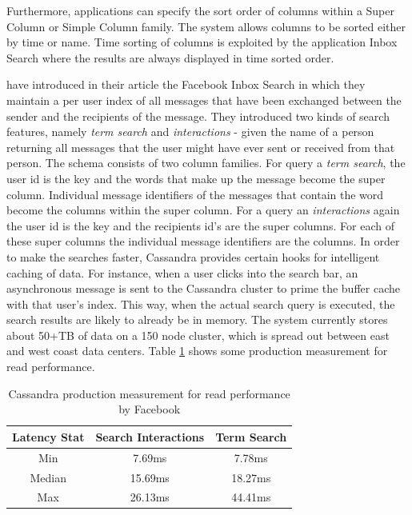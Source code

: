 Furthermore, applications can specify the sort order of columns within a Super Column or Simple Column family. The system allows columns to be sorted either by time or name. Time sorting of columns is exploited by the application Inbox Search where the results are always displayed in time sorted order.

\citeauthor{Lakshman:2010} have introduced in their article \cite{Lakshman:2010} the Facebook Inbox Search in which they maintain a per user index of all messages that have been exchanged between the sender and the recipients of the message. They introduced two kinds of search features, namely \textit{term search} and \textit{interactions} - given the name of a person returning all messages that the user might have ever sent or received from that person. The schema consists of two column families. For query a \textit{term search}, the user id is the key and the words that make up the message become the super column. Individual message identifiers of the messages that contain the word become the columns within the super column. For a query an \textit{interactions} again the user id is the key and the recipients id's are the super columns. For each of these super columns the individual message identifiers are the columns. In order to make the searches faster, Cassandra provides certain hooks for intelligent caching of data. For instance, when a user clicks into the search bar, an asynchronous message is sent to the Cassandra cluster to prime the buffer cache with that user's index. This way, when the actual search query is executed, the search results are likely to already be in memory. The system currently stores about 50+TB of data on a 150 node cluster, which is spread out between east and west coast data centers. Table \ref{tbl:nosql_cas} shows some production measurement for read performance.

\begin{table}[htb]
\begin{tabular}{|c|c|c|}
\hline 
Latency Stat & Search Interactions & Term Search \\ 
\hline 
Min & 7.69ms & 7.78ms \\ 
\hline 
Median & 15.69ms & 18.27ms \\ 
\hline 
Max & 26.13ms & 44.41ms \\ 
\hline 
\end{tabular} 
\caption{Cassandra production measurement for read performance by Facebook}
\label{tbl:nosql_cas}
\protect\cite{Lakshman:2010}
\end{table}

